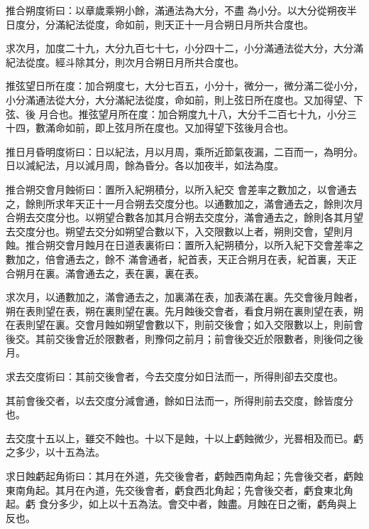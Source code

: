 \begin{pinyinscope}
 推合朔度術曰：以章歲乘朔小餘，滿通法為大分，不盡
 為小分。以大分從朔夜半日度分，分滿紀法從度，命如前，則天正十一月合朔日月所共合度也。



 求次月，加度二十九，大分九百七十七，小分四十二，小分滿通法從大分，大分滿紀法從度。經斗除其分，則次月合朔日月所共合度也。



 推弦望日所在度：加合朔度七，大分七百五，小分十，微分一，微分滿二從小分，小分滿通法從大分，大分滿紀法從度，命如前，則上弦日所在度也。又加得望、下弦、後
 月合也。推弦望月所在度：加合朔度九十八，大分千二百七十九，小分三十四，數滿命如前，即上弦月所在度也。又加得望下弦後月合也。



 推日月昏明度術曰：日以紀法，月以月周，乘所近節氣夜漏，二百而一，為明分。日以減紀法，月以減月周，餘為昏分。各以加夜半，如法為度。



 推合朔交會月蝕術曰：置所入紀朔積分，以所入紀交
 會差率之數加之，以會通去之，餘則所求年天正十一月合朔去交度分也。以通數加之，滿會通去之，餘則次月合朔去交度分也。以朔望合數各加其月合朔去交度分，滿會通去之，餘則各其月望去交度分也。朔望去交分如朔望合數以下，入交限數以上者，朔則交會，望則月蝕。推合朔交會月蝕月在日道表裏術曰：置所入紀朔積分，以所入紀下交會差率之數加之，倍會通去之，餘不
 滿會通者，紀首表，天正合朔月在表，紀首裏，天正合朔月在裏。滿會通去之，表在裏，裏在表。



 求次月，以通數加之，滿會通去之，加裏滿在表，加表滿在裏。先交會後月蝕者，朔在表則望在表，朔在裏則望在裏。先月蝕後交會者，看食月朔在裏則望在表，朔在表則望在裏。交會月蝕如朔望會數以下，則前交後會；如入交限數以上，則前會後交。其前交後會近於限數者，則豫伺之前月；前會後交近於限數者，則後伺之後
 月。



 求去交度術曰：其前交後會者，今去交度分如日法而一，所得則卻去交度也。



 其前會後交者，以去交度分減會通，餘如日法而一，所得則前去交度，餘皆度分也。



 去交度十五以上，雖交不蝕也。十以下是蝕，十以上虧蝕微少，光晷相及而已。虧之多少，以十五為法。



 求日蝕虧起角術曰：其月在外道，先交後會者，虧蝕西南角起；先會後交者，虧蝕東南角起。其月在內道，先交後會者，虧食西北角起；先會後交者，虧食東北角起。虧
 食分多少，如上以十五為法。會交中者，蝕盡。月蝕在日之衝，虧角與上反也。




\end{pinyinscope}
